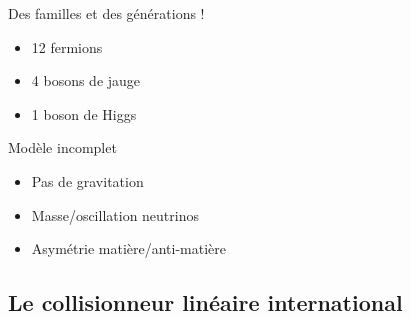 \documentclass[8pt]{beamer}
\begin{document}
\begin{frame}
\begin{minipage}{0.48\linewidth}
    \end{minipage}    
    \begin{minipage}{0.48\linewidth}
      \begin{block}{Des familles et des générations !}
        \begin{itemize}
          \item 12 fermions
          \item 4 bosons de jauge
          \item 1 boson de Higgs
        \end{itemize}
      \end{block}
      \begin{block}{Modèle incomplet}
        \begin{itemize}
          \item Pas de gravitation
          \item Masse/oscillation neutrinos
          \item Asymétrie matière/anti-matière
        \end{itemize}
      \end{block}
    \end{minipage}
  \end{frame}
  
  
  \subsection{Le collisionneur linéaire international}
  
\end{document}

